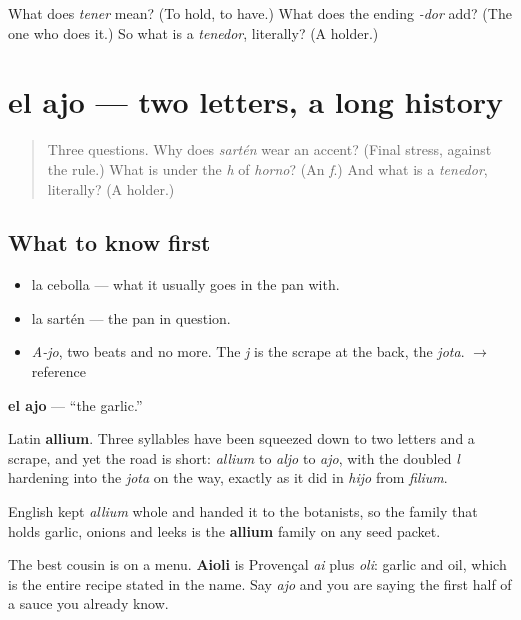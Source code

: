 \begin{tcolorbox}[breakable,colback=teal!4,colframe=teal!35!black,title={Before you move on}]
What does \emph{tener} mean? (To hold, to have.) What does the ending \emph{-dor} add? (The one who does it.) So what is a \emph{tenedor}, literally? (A holder.)
\end{tcolorbox}
\section[el ajo]{el ajo — two letters, a long history}

\label{lesson:ES-C297-ajo}



\begin{quote}
Three questions. Why does \emph{sartén} wear an accent? (Final stress, against the rule.) What is under the \emph{h} of \emph{horno}? (An \emph{f}.) And what is a \emph{tenedor}, literally? (A holder.)
\end{quote}

\subsection*{What to know first}
\begin{itemize}
\raggedright
  \item la cebolla — what it usually goes in the pan with.
  \item la sartén — the pan in question.
\end{itemize}

\begin{sounds}
\begin{itemize}
\raggedright
  \item \emph{A-jo}, two beats and no more. The \emph{j} is the scrape at the back, the \emph{jota}. $\to$ reference
\end{itemize}
\end{sounds}

\begin{cousinweb}
\textbf{el ajo} — \textquotedblleft{}the garlic.\textquotedblright{}

Latin \textbf{allium}. Three syllables have been squeezed down to two letters and a scrape, and yet the road is short: \emph{allium} to \emph{aljo} to \emph{ajo}, with the doubled \emph{l} hardening into the \emph{jota} on the way, exactly as it did in \emph{hijo} from \emph{filium}.

English kept \emph{allium} whole and handed it to the botanists, so the family that holds garlic, onions and leeks is the \textbf{allium} family on any seed packet.

The best cousin is on a menu. \textbf{Aioli} is Provençal \emph{ai} plus \emph{oli}: garlic and oil, which is the entire recipe stated in the name. Say \emph{ajo} and you are saying the first half of a sauce you already know.
\end{cousinweb}

